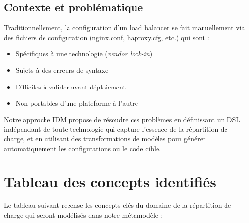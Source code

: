 \documentclass[12pt,a4paper]{report}
\begin{document}
\section{Contexte et problématique}

Traditionnellement, la configuration d'un load balancer se fait manuellement via des fichiers de configuration (nginx.conf, haproxy.cfg, etc.) qui sont :

\begin{itemize}
  \item Spécifiques à une technologie (\textit{vendor lock-in})
  \item Sujets à des erreurs de syntaxe
  \item Difficiles à valider avant déploiement
  \item Non portables d'une plateforme à l'autre
\end{itemize}

Notre approche IDM propose de résoudre ces problèmes en définissant un DSL indépendant de toute technologie qui capture l'essence de la répartition de charge, et en utilisant des transformations de modèles pour générer automatiquement les configurations ou le code cible.

\chapter{Tableau des concepts identifiés}

Le tableau suivant recense les concepts clés du domaine de la répartition de charge qui seront modélisés dans notre métamodèle :
\end{document}

